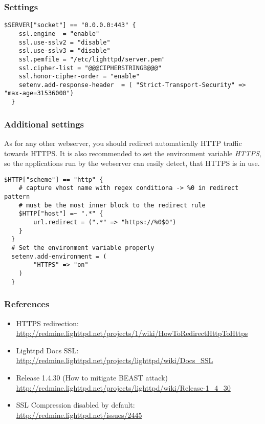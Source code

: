 \subsubsection{Settings}

\begin{lstlisting}[breaklines]
  $SERVER["socket"] == "0.0.0.0:443" {
    ssl.engine  = "enable"
    ssl.use-sslv2 = "disable"
    ssl.use-sslv3 = "disable"
    ssl.pemfile = "/etc/lighttpd/server.pem"
    ssl.cipher-list = "@@@CIPHERSTRINGB@@@"
    ssl.honor-cipher-order = "enable"
    setenv.add-response-header  = ( "Strict-Transport-Security" => "max-age=31536000")
  }
\end{lstlisting}


\subsubsection{Additional settings}

As for any other webserver, you should redirect automatically HTTP traffic towards HTTPS. It is also recommended to set the environment variable \emph{HTTPS}, so the applications run by the webserver can easily detect, that HTTPS is in use.

\begin{lstlisting}[breaklines]
  $HTTP["scheme"] == "http" {
    # capture vhost name with regex conditiona -> %0 in redirect pattern
    # must be the most inner block to the redirect rule
    $HTTP["host"] =~ ".*" {
        url.redirect = (".*" => "https://%0$0")
    }
  }
  # Set the environment variable properly
  setenv.add-environment = (
	    "HTTPS" => "on"
	)
  }
\end{lstlisting}


\subsubsection{References} 
\begin{itemize}
	\item HTTPS redirection: \url{http://redmine.lighttpd.net/projects/1/wiki/HowToRedirectHttpToHttps}
	\item Lighttpd Docs SSL: \url{http://redmine.lighttpd.net/projects/lighttpd/wiki/Docs\_SSL}
	\item Release 1.4.30 (How to mitigate BEAST attack) \url{http://redmine.lighttpd.net/projects/lighttpd/wiki/Release-1\_4\_30}
	\item SSL Compression disabled by default: \url{http://redmine.lighttpd.net/issues/2445}
\end{itemize}

